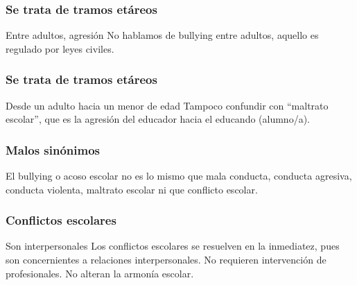 \documentclass[12pt,spanish,x11names]{beamer}
\begin{document}
\begin{frame}[c]
  \frametitle{Se trata de tramos etáreos}
  \begin{alertblock}{Entre adultos, agresión}
    \pause No hablamos de bullying entre adultos, aquello es regulado por leyes civiles.
  \end{alertblock}
\end{frame}
\begin{frame}[c]
  \frametitle{Se trata de tramos etáreos}
  \begin{alertblock}{Desde un adulto hacia un menor de edad}
    \pause Tampoco confundir con ``maltrato escolar'', que es la agresión del educador
    hacia el educando (alumno/a).
  \end{alertblock}
\end{frame}
\begin{frame}
  \frametitle{Malos sinónimos}
  \begin{alertblock}{}
    El bullying o acoso escolar no es lo mismo que mala conducta, conducta
    agresiva, conducta violenta, maltrato escolar ni que \alert{conflicto escolar}. 
  \end{alertblock}
\end{frame}
\begin{frame}
  \frametitle{Conflictos escolares}
  \begin{exampleblock}{Son interpersonales}
    \pause Los conflictos escolares se resuelven en la inmediatez, pues son
    concernientes a relaciones interpersonales. No requieren intervención de
    profesionales. No alteran la armonía escolar.
  \end{exampleblock}
\end{frame}
\end{document}
